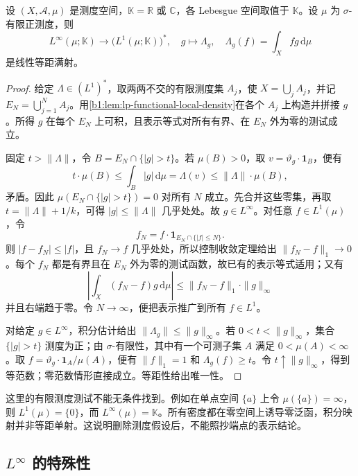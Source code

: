 \begin{theorem}[\(L^1\) 对偶表示]\label{b1:thm:l1-dual-sigma-finite}
设 \((X,\mathcal A,\mu)\) 是测度空间，\(\mathbb K=\mathbb R\) 或 \(\mathbb C\)，各 Lebesgue 空间取值于 \(\mathbb K\)。设 \(\mu\) 为 \(\sigma\)-有限正测度，则
\[
 L^\infty(\mu;\mathbb K)\longrightarrow\bigl(L^1(\mu;\mathbb K)\bigr)^*,
 \quad g\longmapsto\Lambda_g,\quad
 \Lambda_g(f)=\int_Xfg\,\mathrm d\mu
\]
是线性等距满射。
\end{theorem}
\begin{proof}
给定 \(\Lambda\in(L^1)^*\)，取两两不交的有限测度集 \(A_j\)，使 \(X=\bigcup_jA_j\)，并记
\(E_N=\bigcup_{j=1}^NA_j\)。用\cref{b1:lem:lp-functional-local-density}在各个 \(A_j\) 上构造并拼接 \(g\)。所得 \(g\) 在每个 \(E_N\) 上可积，且表示等式对所有有界、在 \(E_N\) 外为零的测试成立。

固定 \(t>\|\Lambda\|\)，令 \(B=E_N\cap\{|g|>t\}\)。若 \(\mu(B)>0\)，取 \(v=\vartheta_g\cdot\mathbf1_B\)，便有
\[
 t\cdot\mu(B)\le\int_B|g|\,\mathrm d\mu
 =\Lambda(v)\le\|\Lambda\|\cdot\mu(B),
\]
矛盾。因此 \(\mu(E_N\cap\{|g|>t\})=0\) 对所有 \(N\) 成立。先合并这些零集，再取 \(t=\|\Lambda\|+1/k\)，可得 \(|g|\le\|\Lambda\|\) 几乎处处。故 \(g\in L^\infty\)。对任意 \(f\in L^1(\mu)\)，令
\[
 f_N=f\cdot\mathbf1_{E_N\cap\{|f|\leq N\}}.
\]
则 \(|f-f_N|\leq|f|\)，且 \(f_N\to f\) 几乎处处，所以控制收敛定理给出 \(\|f_N-f\|_1\to0\)。每个 \(f_N\) 都是有界且在 \(E_N\) 外为零的测试函数，故已有的表示等式适用；又有
\[
 \left|\int_X(f_N-f)g\,\mathrm d\mu\right|
 \le\|f_N-f\|_1\cdot\|g\|_\infty
\]
并且右端趋于零。令 \(N\to\infty\)，便把表示推广到所有 \(f\in L^1\)。

对给定 \(g\in L^\infty\)，积分估计给出 \(\|\Lambda_g\|\le\|g\|_\infty\)。若 \(0<t<\|g\|_\infty\)，集合 \(\{|g|>t\}\) 测度为正；由 \(\sigma\)-有限性，其中有一个可测子集 \(A\) 满足 \(0<\mu(A)<\infty\)。取 \(f=\vartheta_g\cdot\mathbf1_A/\mu(A)\)，便有 \(\|f\|_1=1\) 和 \(\Lambda_g(f)\ge t\)。令 \(t\uparrow\|g\|_\infty\)，得到等范数；零范数情形直接成立。等距性给出唯一性。
\end{proof}

这里的有限测度测试不能无条件找到。例如在单点空间 \(\{a\}\) 上令 \(\mu(\{a\})=\infty\)，则 \(L^1(\mu)=\{0\}\)，而 \(L^\infty(\mu)=\mathbb K\)。所有密度都在零空间上诱导零泛函，积分映射并非等距单射。这说明删除测度假设后，不能照抄端点的表示结论。

\subsection{\texorpdfstring{\(L^\infty\)}{L∞} 的特殊性}
\label{b1:subsec:100304}

